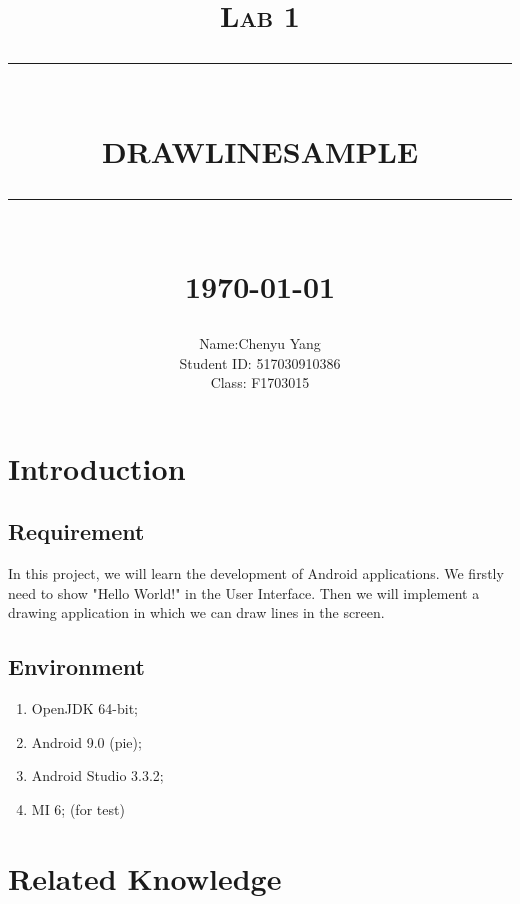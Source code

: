 \documentclass[12pt]{report}
\newcommand{\HRule}[1]{\rule{\linewidth}{#1}}
\begin{document}
\title{ \normalsize \textsc{Lab 1}
        \\ [2.0cm]
        \HRule{0.5pt} \\
        \LARGE \textbf{\uppercase{DrawLineSample}}
        \HRule{2pt} \\ [0.5cm]
        \normalsize \today \vspace*{5\baselineskip}}

\date{}

\author{
        Name:Chenyu Yang \\
        Student ID: 517030910386 \\ 
        Class: F1703015 }

\maketitle
\tableofcontents
\newpage

\sectionfont{\scshape}


\section{Introduction}
\subsection{Requirement}
In this project, we will learn the development of Android applications. We firstly need to show "Hello World!" in the User Interface. Then we will implement a drawing application in which we can draw lines in the screen.
\subsection{Environment}
\begin{enumerate}
	\item OpenJDK 64-bit;
	\item Android 9.0 (pie);
	\item Android Studio 3.3.2;
	\item MI 6; (for test)
\end{enumerate}
\section{Related Knowledge}
\end{document}
